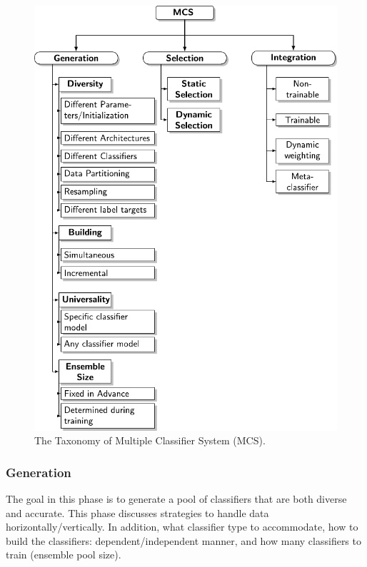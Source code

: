 \begin{figure}[!ht]
    \centering
    \includegraphics[width=.95\textwidth]{2_Background/figures/fig-taxonomy.pdf}
    \caption{The Taxonomy of Multiple Classifier System (MCS).}
    \label{ch2:ensemble-taxonomy}
\end{figure}



\subsubsection{Generation} \label{sub.generation}
The goal in this phase is to generate a pool of classifiers that are both diverse and accurate. This phase discusses strategies to handle data horizontally/vertically. In addition, what classifier type to accommodate, how to build the classifiers: dependent/independent manner, and how many classifiers to train (ensemble pool size). 

